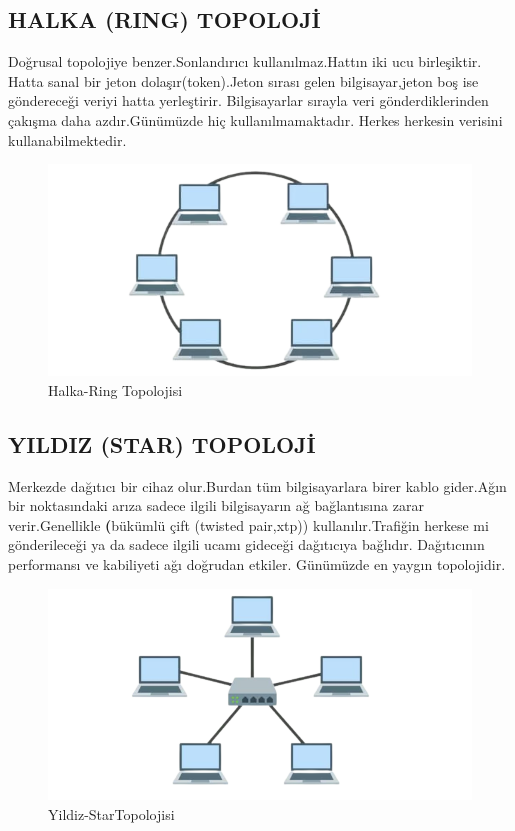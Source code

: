 \subsection*{HALKA (RING) TOPOLOJİ}
Doğrusal topolojiye benzer.Sonlandırıcı kullanılmaz.Hattın iki ucu birleşiktir.
Hatta sanal  bir jeton dolaşır(token).Jeton sırası gelen bilgisayar,jeton boş ise göndereceği veriyi hatta yerleştirir.
Bilgisayarlar sırayla  veri gönderdiklerinden çakışma daha azdır.Günümüzde hiç kullanılmamaktadır.
Herkes herkesin verisini kullanabilmektedir.
\begin{figure}[!ht]
    \includegraphics{images/ring-topology-removebg-preview}
    \caption{Halka-Ring Topolojisi}
   \label{fig:halka_topolojisi}
  \end{figure}
 

\subsection*{YILDIZ (STAR) TOPOLOJİ}
Merkezde dağıtıcı bir cihaz olur.Burdan tüm bilgisayarlara birer kablo gider.Ağın bir noktasındaki arıza sadece ilgili bilgisayarın ağ bağlantısına zarar verir.Genellikle \textbf(bükümlü çift (twisted pair,xtp)) kullanılır.Trafiğin herkese mi gönderileceği ya da sadece ilgili ucamı gideceği dağıtıcıya bağlıdır.
Dağıtıcının  performansı ve kabiliyeti ağı doğrudan  etkiler.
Günümüzde en yaygın topolojidir.
\begin{figure}[!ht]
    \includegraphics{images/star-Topology-1024x512-removebg-preview}
    \caption{Yildiz-StarTopolojisi}
   \label{fig:yildiz_topolojisi}
  \end{figure}


